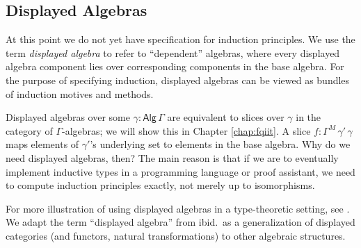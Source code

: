 \documentclass[12pt,a4paper,twoside,openany]{book}
\theoremstyle{remark}
\theoremstyle{definition}
\theoremstyle{theorem}
\newcommand{\ms}[1]{\mathsf{#1}}
\newcommand{\Alg}{\ms{Alg}}
\begin{document}
\subsection{Displayed Algebras}

At this point we do not yet have specification for induction principles. We use
the term \emph{displayed algebra} to refer to ``dependent'' algebras, where
every displayed algebra component lies over corresponding components in the base
algebra. For the purpose of specifying induction, displayed algebras can be
viewed as bundles of induction motives and methods.

Displayed algebras over some $\gamma : \Alg\,\Gamma$ are equivalent to slices
over $\gamma$ in the category of $\Gamma$-algebras; we will show this in Chapter
\ref{chap:fqiit}. A slice $f : \Gamma^M\,\gamma'\,\gamma$ maps elements of
$\gamma'$'s underlying set to elements in the base algebra. Why do we need
displayed algebras, then? The main reason is that if we are to eventually
implement inductive types in a programming language or proof assistant, we need
to compute induction principles exactly, not merely up to isomorphisms.

For more illustration of using displayed algebras in a type-theoretic
setting, see \cite{displayedcats}. We adapt the term ``displayed algebra'' from
ibid.\ as a generalization of displayed categories (and functors, natural
transformations) to other algebraic structures.
\end{document}
